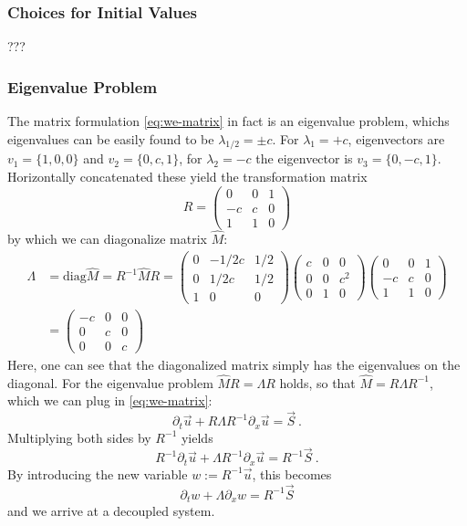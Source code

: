 \subsubsection{Choices for Initial Values}
???

\subsubsection{Eigenvalue Problem}
The matrix formulation \ref{eq:we-matrix} in fact is an eigenvalue problem, whichs eigenvalues can be easily found to be $\lambda_{1/2} = \pm c$. For $\lambda_1 = + c$, eigenvectors are $v_1 = \{1,0,0\}$ and $v_2 = \{0,c,1\}$, for $\lambda_2 = -c$ the eigenvector is $v_3 = \{0, -c, 1\}$.
Horizontally concatenated these yield the transformation matrix
\[  R =
\begin{pmatrix}
	0 & 0 & 1 \\
	-c & c & 0 \\
	1 & 1 & 0
\end{pmatrix}
\]
by which we can diagonalize matrix $\hat{M}$:
\begin{align*}
	\Lambda &= \text{diag} \hat{M} = R^{-1} \hat{M} R =
	\begin{pmatrix}
	0 & -1/2c & 1/2\\
	0 & 1/2c & 1/2 \\
	1 & 0 & 0
	\end{pmatrix}
	\begin{pmatrix}
		c & 0 & 0 \\
		0 & 0 & c^2 \\
		0 & 1 & 0
	\end{pmatrix}
	\begin{pmatrix}
		0 & 0 & 1 \\
		-c & c & 0 \\
		1 & 1 & 0
	\end{pmatrix} \\
 &=
 \begin{pmatrix}
 	-c & 0 & 0 \\
 	0 & c & 0 \\
 	0 & 0& c
 \end{pmatrix}
\end{align*}
Here, one can see that the diagonalized matrix simply has the eigenvalues on the diagonal.
For the eigenvalue problem $\hat{M} R = \Lambda R$ holds, so that $\hat{M} = R \Lambda R^{-1}$, which we can plug in \ref{eq:we-matrix}:
\begin{equation}
	\partial_t \vec{u} +  R \Lambda R^{-1} \partial_x \vec{u} = \vec{S}~.
\end{equation}
Multiplying both sides by $R^{-1}$ yields
\begin{equation}
	R^{-1} \partial_t \vec{u} +  \Lambda R^{-1} \partial_x \vec{u} = R^{-1} \vec{S}~.
\end{equation}
By introducing the new variable $w := R^{-1} \vec{u}$, this becomes
\begin{equation}
\partial_t w +  \Lambda \partial_x w = R^{-1} \vec{S}
\end{equation}
and we arrive at a decoupled system.



